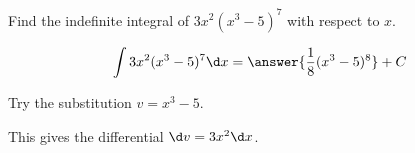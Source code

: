 \documentclass{ximera}
\author{Gregory Hartman \and Matthew Carr\and Nela Lakos \and Bobby Ramsey}
\begin{document}
\begin{exercise}

Find the indefinite integral of $3x^2(x^3-5)^7$ with respect to $x$.

\[
\int 3x^2(x^3-5)^7 \d x=\answer{\frac{1}{8}(x^3-5)^8}+C
\]

\begin{hint}
	Try the substitution $v=x^3-5$.
\end{hint}
\begin{hint}
	This gives the differential  $\d v=3x^2 \d x$.
\end{hint}
\end{exercise}
\end{document}
